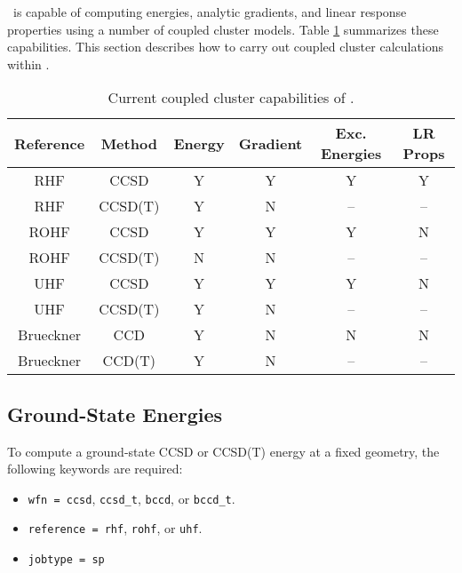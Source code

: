 \PSIthree\ is capable of computing energies, analytic gradients, and
linear response properties using a number of coupled cluster models.
Table \ref{table:ccsummary} summarizes these capabilities.  This
section describes how to carry out coupled cluster calculations within
\PSIthree.
\begin{table}
\begin{center}
\begin{tabular}{cccccc}
\hline
\hline
Reference & Method & Energy    & Gradient  &  Exc. Energies & LR Props \\
\hline
RHF       & CCSD    & Y & Y & Y & Y  \\
RHF       & CCSD(T) & Y & N & --& -- \\
ROHF      & CCSD    & Y & Y & Y & N  \\
ROHF      & CCSD(T) & N & N & --& -- \\
UHF       & CCSD    & Y & Y & Y & N  \\
UHF       & CCSD(T) & Y & N & --& -- \\
Brueckner & CCD     & Y & N & N & N  \\
Brueckner & CCD(T)  & Y & N & --& -- \\
\hline
\hline
\end{tabular}
\end{center}
\caption{Current coupled cluster capabilities of \PSIthree.}
\label{table:ccsummary}
\end{table}

\subsection{Ground-State Energies}

To compute a ground-state CCSD or CCSD(T) energy at a fixed geometry,
the following keywords are required:
\begin{itemize}
\item {\tt wfn = ccsd}, {\tt ccsd\_t}, {\tt bccd}, or {\tt bccd\_t}.
\item {\tt reference = rhf}, {\tt rohf}, or {\tt uhf}.
\item {\tt jobtype = sp}
\end{itemize}

